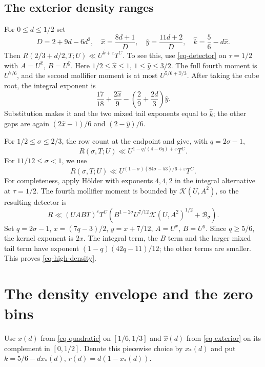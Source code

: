 \documentclass[11pt,a4paper]{article}
\numberwithin{equation}{section}
\theoremstyle{remark}
\newcommand{\eps}{\varepsilon}
\newcommand{\K}{\mathcal K}
\newcommand{\B}{\mathcal B}
\begin{document}
\subsection{The exterior density ranges}

For $0\le d\le1/2$ set
\begin{equation}\label{eq-exterior}
 D=2+9d-6d^2,\quad
 \widehat x=\frac{8d+1}{D},\quad
 \widehat y=\frac{11d+2}{D},\quad
 \widehat k=\frac56-d\widehat x.
\end{equation}
Then $R(2/3+d/2,T;U)\ll U^{\widehat k+\eps}T^C$.
To see this, use \eqref{eq-detector} on $\tau=1/2$ with
$A=U^{\widehat x}$, $B=U^{\widehat y}$.  Here
$1/2\le\widehat x\le1$, $1\le\widehat y\le3/2$.
The full fourth moment is $U^{7/6}$, and the second mollifier
moment is at most $U^{5/6+\widehat x/3}$.  After taking the
cube root, the integral exponent is
\[
 \frac{17}{18}+\frac{2\widehat x}{9}
             -\left(\frac29+\frac{2d}{3}\right)\widehat y.
\]
Substitution makes it and the two mixed tail exponents equal to
$\widehat k$; the other gaps are again
$(2\widehat x-1)/6$ and $(2-\widehat y)/6$.

For $1/2\le\sigma\le2/3$, the row count at the endpoint and
\cite[Corollary~1.5]{DF} give, with $q=2\sigma-1$,
\begin{equation}\label{eq-low-density}
 R(\sigma,T;U)\ll U^{1-q/(4-6q)+\eps}T^C.
\end{equation}
For $11/12\le\sigma<1$, we use
\begin{equation}\label{eq-high-density}
 R(\sigma,T;U)\ll
 U^{(1-\sigma)(84\sigma-53)/6+\eps}T^C.
\end{equation}
For completeness, apply H\"older with exponents $4,4,2$ in the
integral alternative at $\tau=1/2$.  The fourth mollifier moment
is bounded by $\K(U,A^2)$, so the resulting detector is
\[
 R\ll(UABT)^\eps T^C
 \left(B^{1-2\sigma}U^{7/12}\K(U,A^2)^{1/2}+\B_\sigma\right).
\]
Set $q=2\sigma-1$, $x=(7q-3)/2$, $y=x+7/12$,
$A=U^x$, $B=U^y$.  Since $q\ge5/6$, the kernel exponent is
$2x$.  The integral term, the $B$ term and the larger mixed
tail term have exponent $(1-q)(42q-11)/12$; the other terms
are smaller.  This proves \eqref{eq-high-density}.

\section{The density envelope and the zero bins}

Use $x(d)$ from \eqref{eq-quadratic} on $[1/6,1/3]$ and
$\widehat x(d)$ from \eqref{eq-exterior} on its complement
in $[0,1/2]$.  Denote this piecewise choice by $x_*(d)$ and put
$k=5/6-dx_*(d)$, $r(d)=d(1-x_*(d))$.
\end{document}
